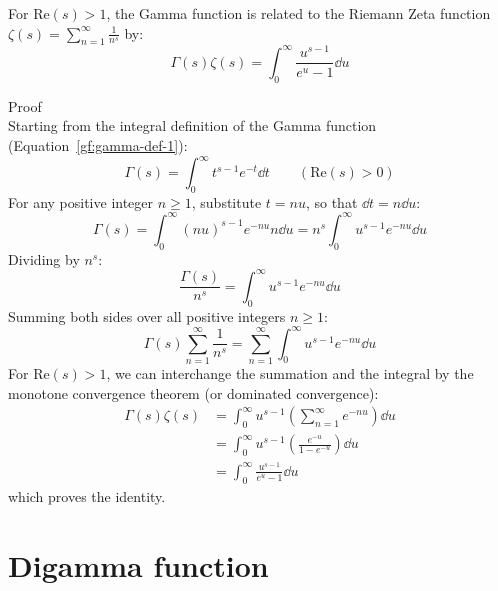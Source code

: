 \documentclass[a4paper]{article}
\begin{document}
    \begin{theorem}
        For $\mathrm{Re}(s) > 1$, the Gamma function is related to the Riemann Zeta function $\zeta(s) = \sum_{n=1}^\infty \frac{1}{n^s}$ by:
        \begin{equation}
            \label{gf:eq:equation11}
            \boxed{
                \Gamma(s) \zeta(s) = \int_{0}^{\infty} \frac{u^{s-1}}{e^{u} - 1} \dd u
            }
        \end{equation}

        Proof
        \\
        Starting from the integral definition of the Gamma function (Equation~\ref{gf:gamma-def-1}):
        \begin{equation*}
            \Gamma(s) = \int_{0}^{\infty} t^{s-1} e^{-t} \dd t \qquad (\mathrm{Re}(s) > 0)
        \end{equation*}
        For any positive integer $n \ge 1$, substitute $t = n u$, so that $\dd t = n \dd u$:
        \begin{equation*}
            \Gamma(s) = \int_{0}^{\infty} (n u)^{s-1} e^{-n u} n \dd u = n^s \int_{0}^{\infty} u^{s-1} e^{-n u} \dd u
        \end{equation*}
        Dividing by $n^s$:
        \begin{equation*}
            \frac{\Gamma(s)}{n^s} = \int_{0}^{\infty} u^{s-1} e^{-n u} \dd u
        \end{equation*}
        Summing both sides over all positive integers $n \ge 1$:
        \begin{equation*}
            \Gamma(s) \sum_{n=1}^{\infty} \frac{1}{n^s} = \sum_{n=1}^{\infty} \int_{0}^{\infty} u^{s-1} e^{-n u} \dd u
        \end{equation*}
        For $\mathrm{Re}(s) > 1$, we can interchange the summation and the integral by the monotone convergence theorem (or dominated convergence):
        \begin{align*}
            \Gamma(s) \zeta(s) & = \int_{0}^{\infty} u^{s-1} \left( \sum_{n=1}^{\infty} e^{-n u} \right) \dd u \\
            & = \int_{0}^{\infty} u^{s-1} \left( \frac{e^{-u}}{1 - e^{-u}} \right) \dd u \\
            & = \int_{0}^{\infty} \frac{u^{s-1}}{e^u - 1} \dd u
        \end{align*}
        which proves the identity.
    \end{theorem}


    \section{Digamma function}\label{gf:sec:digamma-function}
\end{document}
